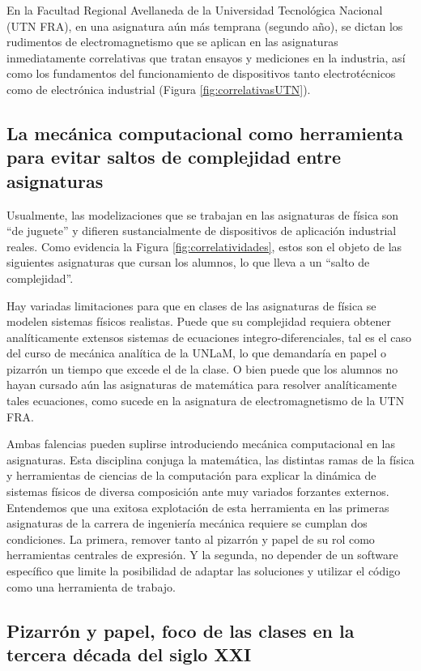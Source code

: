 \documentclass[a4paper]{fodami}        %
\begin{document}
En la Facultad Regional Avellaneda de la Universidad Tecnológica Nacional (UTN FRA), en una asignatura aún más temprana (segundo año), se dictan los rudimentos de electromagnetismo que se aplican en las asignaturas inmediatamente correlativas que tratan ensayos y mediciones en la industria, así como los fundamentos del funcionamiento de dispositivos tanto electrotécnicos como de electrónica industrial (Figura \ref{fig:correlativasUTN}).


\subsection{La mecánica computacional como herramienta para evitar saltos de complejidad entre asignaturas}

Usualmente, las modelizaciones que se trabajan en las asignaturas de física son ``de juguete'' y difieren sustancialmente de dispositivos de aplicación industrial reales.
Como evidencia la Figura \ref{fig:correlatividades}, estos son el objeto de las siguientes asignaturas que cursan los alumnos, lo que lleva a un ``salto de complejidad''.

Hay variadas limitaciones para que en clases de las asignaturas de física se modelen sistemas físicos realistas.
Puede que su complejidad requiera obtener analíticamente extensos sistemas de ecuaciones integro-diferenciales, tal es el caso del curso de mecánica analítica de la UNLaM, lo que demandaría en papel o pizarrón un tiempo que excede el de la clase.
O bien puede que los alumnos no hayan cursado aún las asignaturas de matemática para resolver analíticamente tales ecuaciones, como sucede en la asignatura de electromagnetismo de la UTN FRA.

Ambas falencias pueden suplirse introduciendo mecánica computacional en las asignaturas. 
Esta disciplina conjuga la matemática, las distintas ramas de la física y herramientas de ciencias de la computación para explicar la dinámica de sistemas físicos de diversa composición ante muy variados forzantes externos.
Entendemos que una exitosa explotación de esta herramienta en las primeras asignaturas de la carrera de ingeniería mecánica requiere se cumplan dos condiciones.
La primera, remover tanto al pizarrón y papel de su rol como herramientas centrales de expresión. Y la segunda, no depender de un software específico que limite la posibilidad de adaptar las soluciones y utilizar el código como una herramienta de trabajo. 



\subsection{Pizarrón y papel, foco de las clases en la tercera década del siglo XXI}	
\end{document}
